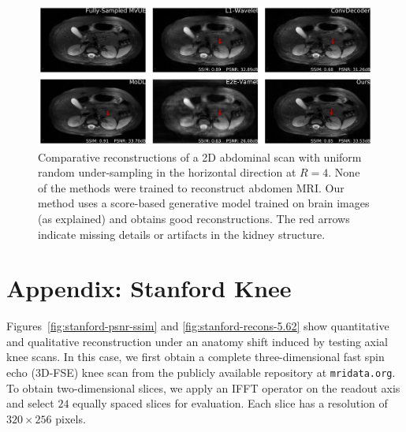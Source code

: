 \begin{figure}
    \centering
    \includegraphics[width=\columnwidth]{abdomen-random-horizontal-R=4-slice=10-comp-annotated.pdf}
    \caption{\small Comparative reconstructions of a 2D abdominal scan with uniform random under-sampling in the horizontal direction at $R=4$. None of the methods were trained to reconstruct abdomen MRI. Our method uses a score-based generative model trained on brain images (as explained) and obtains good reconstructions. The red arrows indicate missing details or artifacts in the kidney structure. 
    }
    \label{fig:abdomen-slice-8}
\end{figure}


\section{Appendix: Stanford Knee}\label{app:3d-knees}
Figures~\ref{fig:stanford-psnr-ssim} and
\ref{fig:stanford-recons-5.62} show quantitative and qualitative
reconstruction under an anatomy shift induced by testing axial knee
scans. In this case, we first obtain a complete three-dimensional fast
spin echo (3D-FSE) knee scan from the publicly available repository at
\texttt{mridata.org}. To obtain two-dimensional slices, we apply an
IFFT operator on the readout axis and select $24$ equally spaced
slices for evaluation. Each slice has a resolution of $320 \times 256$
pixels.


